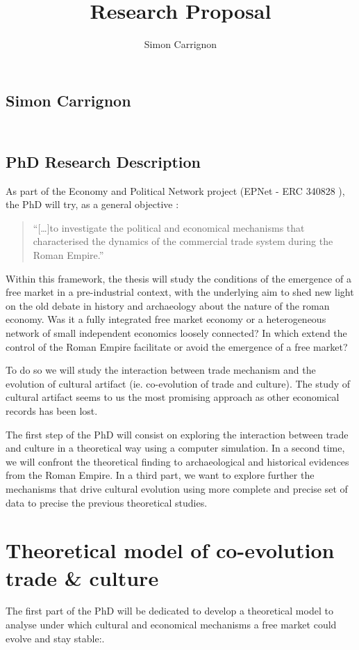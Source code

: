 \documentclass[a4paper]{article}
\title{Research Proposal}
\author{Simon Carrignon}
\begin{document}
\subsection*{Simon Carrignon}
\subsection*{\\PhD Research Description}

As part of the Economy and Political Network project (EPNet - ERC 340828 ), the PhD will try, as a general objective :
\begin{quote}
	``[\ldots]to investigate the political and economical mechanisms that characterised the dynamics of the commercial trade system during the Roman Empire.''
\end{quote}

Within this framework, the thesis will study the conditions of the emergence of a free market in a pre-industrial context, with the underlying aim to shed new light on the old debate in history and archaeology about the nature of the roman economy. Was it a fully integrated free market economy or a heterogeneous network of small independent economics loosely connected? In which extend the control of the Roman Empire facilitate or avoid the emergence of a free market?

To do so we will study the interaction between trade mechanism and the evolution of cultural artifact (ie. co-evolution of trade and culture). The study of cultural artifact seems to us the most promising approach as other economical records has been lost.


The first step of the PhD will consist on exploring the interaction between trade and culture in a theoretical way using a computer simulation. In a second time, we will confront the theoretical finding to archaeological and historical evidences from the Roman Empire. In a third part, we want to explore further  the mechanisms that drive cultural evolution using more complete and precise set of data to precise the previous theoretical studies.


\section{Theoretical model of co-evolution trade \& culture}
The first part of the PhD will be dedicated to develop a theoretical model to analyse under which cultural and economical mechanisms a free market could evolve and stay stable:. 
\end{document}
